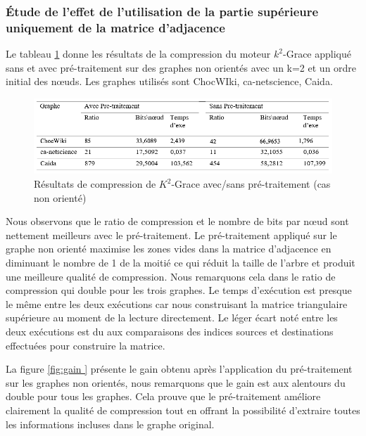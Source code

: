 \subsubsection{Étude de l'effet de l'utilisation de la partie supérieure uniquement de la matrice d'adjacence}


Le tableau \ref{fig:tab-pret } donne les résultats de la compression du moteur $k^2$-Grace appliqué sans et avec pré-traitement sur des graphes non orientés avec un k=2 et un ordre initial des nœuds. Les graphes utilisés sont ChocWIki, ca-netscience, Caida. 
 

\begin{figure}[H]
	\centering
	\includegraphics[scale=0.9]{ressources/image/Tests/tab-pret.png}
	\caption{Résultats de compression de $K^2$-Grace avec/sans pré-traitement (cas non orienté)}
	\label{fig:tab-pret }
\end{figure}

Nous observons que le ratio de compression et le nombre de bits par nœud sont nettement meilleurs avec le pré-traitement. Le pré-traitement appliqué sur le graphe non orienté maximise les zones vides dans la matrice d'adjacence en diminuant le nombre de 1 de la moitié ce qui réduit la taille de l'arbre et produit une meilleure qualité de compression. Nous remarquons cela dans le ratio de compression qui double pour les trois graphes. Le temps d'exécution est presque le même entre les deux exécutions car nous construisant la matrice triangulaire supérieure au moment de la lecture directement. Le léger écart noté entre les deux exécutions est du aux comparaisons des indices sources et destinations effectuées pour construire la matrice. 

La figure \ref{fig:gain } présente le gain obtenu après l'application du pré-traitement sur les graphes non orientés, nous remarquons que le gain est aux alentours du double pour tous les graphes. Cela prouve que le pré-traitement améliore clairement la qualité de compression tout en offrant la possibilité d'extraire toutes les informations incluses dans le graphe original.

